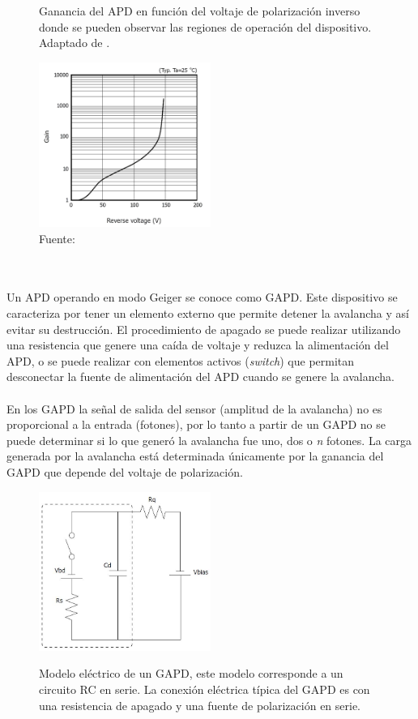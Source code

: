 \begin{figure}[h!]
\begin{centering}
  \caption{Ganancia del APD en función del voltaje de polarización inverso donde se pueden observar las regiones de operación del dispositivo. Adaptado de \citep{MPPC_note}.}
  \includegraphics[width=0.5\textwidth]{Images/GAPD_gain.JPG}
  \caption*{Fuente:}
  \label{fig:APD_gain}
  \par\end{centering}
\end{figure}
 \\ \\
Un APD operando en modo Geiger se conoce como GAPD. Este dispositivo se caracteriza por tener un elemento externo que permite detener la avalancha y así evitar su destrucción. El procedimiento de apagado se puede realizar utilizando una resistencia que genere una caída de voltaje y reduzca la alimentación del APD, o se puede realizar con elementos activos (\textit{switch}) que permitan desconectar la fuente de alimentación del APD cuando se genere la avalancha.\\ \\
En los GAPD la señal de salida del sensor (amplitud de la avalancha) no es proporcional a la entrada (fotones), por lo tanto a partir de un GAPD no se puede determinar si lo que generó la avalancha fue uno, dos o \textit{n} fotones. La carga generada por la avalancha está determinada únicamente por la ganancia del GAPD que  depende del voltaje de polarización.     
\begin{figure}[h!]
\begin{centering}
    \caption{Modelo eléctrico de un GAPD, este modelo corresponde a un circuito RC en serie. La conexión eléctrica típica del GAPD es con una resistencia de apagado y una fuente de polarización en serie.}
    \includegraphics[width=0.5\textwidth]{Images/GAPD_model.JPG}
    \label{fig:APD_model}
  \par\end{centering}
\end{figure}
